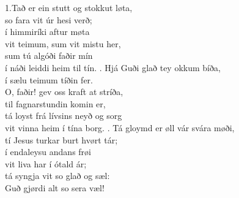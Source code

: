 \clearpage
{}

1.Tað er ein stutt og stokkut løta, \\
so fara vit úr hesi verð; \\
í himmiríki aftur møta \\
vit teimum, sum vit mistu her, \\
sum tú algóði faðir mín \\
í náði leiddi heim til tín. 
. Hjá Guði glað tey okkum bíða, \\
í sælu teimum tíðin fer. \\
O, faðir! gev oss kraft at stríða, \\
til fagnarstundin komin er, \\
tá loyst frá lívsins neyð og sorg \\
vit vinna heim í tína borg. 
. Tá gloymd er øll vár svára møði, \\
tí Jesus turkar burt hvørt tár; \\
í endaleysu andans frøi \\
vit liva har í ótald ár; \\
tá syngja vit so glað og sæl: \\
Guð gjørdi alt so sera væl!


\clearpage
{}

